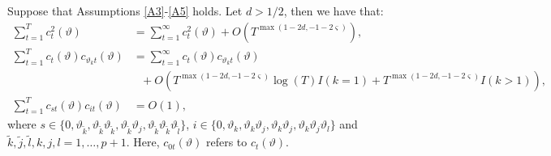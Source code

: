 {{\begin{lemma} \label{genlemmaaaa2n} Suppose that Assumptions \ref{A3}-\ref{A5} holds. Let $d > 1/2$, then we have that:
\begin{align}
     \sum_{t = 1}^T c^2_{t}(\vartheta) &= \sum_{t = 1}^{\infty} c^2_{t}(\vartheta) + O(T^{\max(1-2d,-1-2\varsigma) }), \label{2na} \\
    \sum_{t = 1}^T c_{t}(\vartheta) c_{\vartheta_k t}(\vartheta) &= \sum_{t = 1}^{\infty} c_{t}(\vartheta) c_{\vartheta_k t}(\vartheta) \nonumber \\  
    &\ \ \ + O(T^{\max(1-2d,-1-2\varsigma) }  \log(T) I( k = 1) + T^{\max(1-2d,-1-2\varsigma) }   I( k > 1)),\label{2nb} \\
    \sum_{t = 1}^T c_{s t}(\vartheta) c_{i t}(\vartheta) &= O(1), \label{2nc}
\end{align} 
where $s \in \{0,\vartheta_{\tilde{k}},\vartheta_{\tilde{k}} \vartheta_{\tilde{k}}, \vartheta_{\tilde{k}} \vartheta_j,\vartheta_{\tilde{k}} \vartheta_{\tilde{k}} \vartheta_{\tilde{l}} \}$, $i \in \{0,\vartheta_k,\vartheta_k \vartheta_j, \vartheta_k \vartheta_j,\vartheta_k \vartheta_j \vartheta_l \}$ and $\tilde{k},\tilde{j},\tilde{l},k,j,l = 1,\ldots, p+1$. Here, $c_{0t}(\vartheta)$ refers to $c_{t}(\vartheta)$. 


\end{lemma}}}
